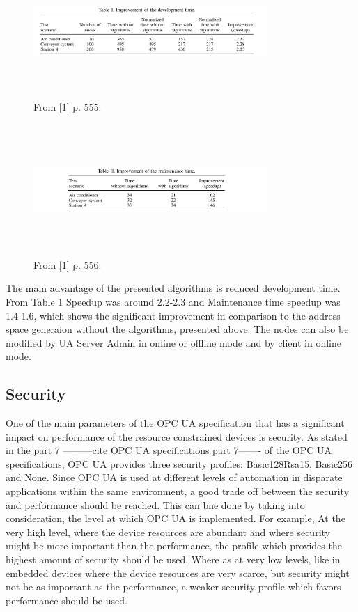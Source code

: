 \documentclass[conference]{IEEEtran}
\begin{document}
\begin{figure}[ht]
\centering
\includegraphics[height=50mm, width = 3.5in]{Figures/Table1}\quad
\caption[Subfigure example]{\label{f:Table1}From [1] p. 555.}
\end{figure}

\begin{figure}[ht]
\centering
\includegraphics[height=50mm,width = 3.5in]{Figures/Table2}\quad
\caption[Subfigure example]{\label{f:Table2}From [1] p. 556.}
\end{figure}


The main advantage of the presented algorithms is reduced development time. From Table 1 Speedup was around 2.2-2.3 and Maintenance time speedup was 1.4-1.6, which shows the significant improvement in comparison to the address space generaion without the algorithms, presented above. The nodes can also be modified by UA Server Admin in online or offline mode and by client in online mode.

\subsection{Security}
One of the main parameters of the OPC UA specification that has a significant impact on performance of the resource constrained devices is security. As stated in the part 7 ---------cite OPC UA specifications part 7------- of the OPC UA specifications, OPC UA provides three security profiles: Basic128Rsa15, Basic256 and None. Since OPC UA is used at different levels of automation in disparate applications within the same environment, a good trade off between the security and performance should be reached. This can bne done by taking into consideration, the level at which OPC UA is implemented. For example, At the very high level, where the device resources are abundant and where security might be more important than the performance, the profile which provides the highest amount of security should be used. Where as at very low levels, like in embedded devices where the device resources are very scarce, but security might not be as important as the performance, a weaker security profile which favors performance should be used.
\end{document}
